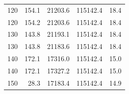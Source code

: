 \begin{table}[htbp]
\begin{tabular}{rrrrr}
    120 & \num{154.1} & \num{21203.6} & \num{115142.4} & 18.4 \\
    120 & \num{154.2} & \num{21203.6} & \num{115142.4} & 18.4 \\
    130 & \num{143.8} & \num{21193.1} & \num{115142.4} & 18.4 \\
    130 & \num{143.8} & \num{21183.6} & \num{115142.4} & 18.4 \\
    140 & \num{172.1} & \num{17316.0} & \num{115142.4} & 15.0 \\
    140 & \num{172.1} & \num{17327.2} & \num{115142.4} & 15.0 \\
    150 & \num{28.3} & \num{17183.4} & \num{115142.4} & 14.9 \\
    \bottomrule
  \end{tabular}
\end{table}
